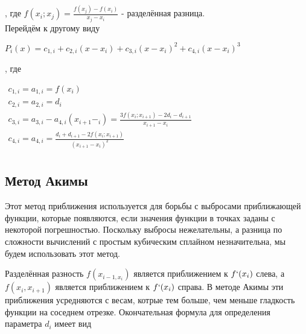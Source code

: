 , где $f(x_i;x_j) = \frac{f(x_j)-f(x_i)}{x_j-x_i}$ - разделённая разница.\\
Перейдём к другому виду
\begin{center}
	$P_i(x)=c_{1,i} + c_{2,i}(x-x_i)+c_{3,i}(x-x_i)^2+c_{4,i}(x-x_i)^3$
\end{center} 
, где 
\begin{center}
	$\begin{array}{l}
	c_{1,i}=a_{1,i}=f(x_i)\\
	c_{2,i}=a_{2,i}=d_i\\
	c_{3,i}=a_{3,i} - a_{4,i}(x_{i+1}-_i)=\frac{3f(x_i;x_{i+1})-2d_i-d_{i+1}}{x_{i+1} - x_i}\\
	c_{4,i}=a_{4,i}=\frac{d_i +d_{i+1} - 2f(x_i;x_{i+1})}{(x_{i+1}-x_i)^2}\\
	\end{array}$
\end{center}
\subsection{Метод Акимы}
Этот метод приближения используется для борьбы с выбросами приближающей функции, которые появляются, если значения функции в точках заданы с некоторой погрешностью. Поскольку выбросы нежелательны, а разница по сложности вычислений с простым кубическим сплайном незначительна, мы будем использовать этот метод.\cite{aspline70}\cite{comp07}\\
\par Разделённая разность $f(x_{i-1,x_i})$ является приближением к $f`(x_i)$ слева, а $f(x_i,x_{i+1})$ является приближением к $f`(x_i)$ справа. В методе Акимы эти приближения усредняются с весам, котрые тем больше, чем меньше гладкость функции на соседнем отрезке. Окончательная формула для определения параметра $d_i$ имеет вид\\

